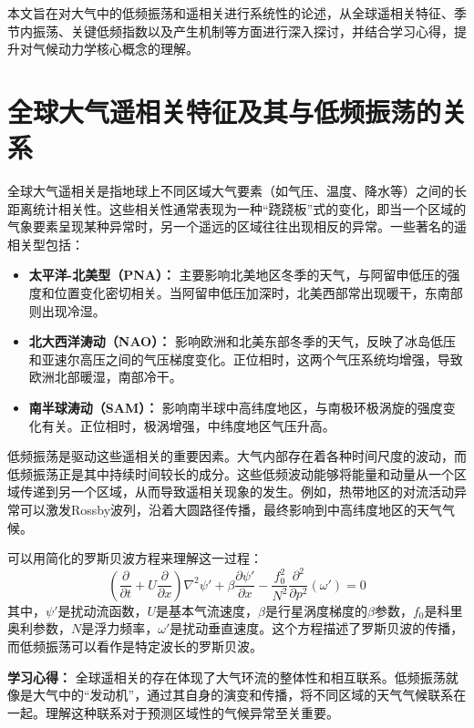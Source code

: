 \documentclass[10pt,hyperref,a4paper,UTF8]{ctexart}
\begin{document}
本文旨在对大气中的低频振荡和遥相关进行系统性的论述，从全球遥相关特征、季节内振荡、关键低频指数以及产生机制等方面进行深入探讨，并结合学习心得，提升对气候动力学核心概念的理解。
\section{全球大气遥相关特征及其与低频振荡的关系}

全球大气遥相关是指地球上不同区域大气要素（如气压、温度、降水等）之间的长距离统计相关性。这些相关性通常表现为一种“跷跷板”式的变化，即当一个区域的气象要素呈现某种异常时，另一个遥远的区域往往出现相反的异常。一些著名的遥相关型包括：

\begin{itemize}
    \item \textbf{太平洋-北美型（PNA）：} 主要影响北美地区冬季的天气，与阿留申低压的强度和位置变化密切相关。当阿留申低压加深时，北美西部常出现暖干，东南部则出现冷湿。
    \item \textbf{北大西洋涛动（NAO）：} 影响欧洲和北美东部冬季的天气，反映了冰岛低压和亚速尔高压之间的气压梯度变化。正位相时，这两个气压系统均增强，导致欧洲北部暖湿，南部冷干。
    \item \textbf{南半球涛动（SAM）：} 影响南半球中高纬度地区，与南极环极涡旋的强度变化有关。正位相时，极涡增强，中纬度地区气压升高。
\end{itemize}

低频振荡是驱动这些遥相关的重要因素。大气内部存在着各种时间尺度的波动，而低频振荡正是其中持续时间较长的成分。这些低频波动能够将能量和动量从一个区域传递到另一个区域，从而导致遥相关现象的发生。例如，热带地区的对流活动异常可以激发Rossby波列，沿着大圆路径传播，最终影响到中高纬度地区的天气气候。

可以用简化的罗斯贝波方程来理解这一过程：
\begin{equation}
\left(\frac{\partial}{\partial t} + U \frac{\partial}{\partial x}\right) \nabla^2 \psi' + \beta \frac{\partial \psi'}{\partial x} - \frac{f_0^2}{N^2} \frac{\partial^2}{\partial p^2} (\omega') = 0
\end{equation}
其中，$\psi'$是扰动流函数，$U$是基本气流速度，$\beta$是行星涡度梯度的$\beta$参数，$f_0$是科里奥利参数，$N$是浮力频率，$\omega'$是扰动垂直速度。这个方程描述了罗斯贝波的传播，而低频振荡可以看作是特定波长的罗斯贝波。

\textbf{学习心得：} 全球遥相关的存在体现了大气环流的整体性和相互联系。低频振荡就像是大气中的“发动机”，通过其自身的演变和传播，将不同区域的天气气候联系在一起。理解这种联系对于预测区域性的气候异常至关重要。
\end{document}
